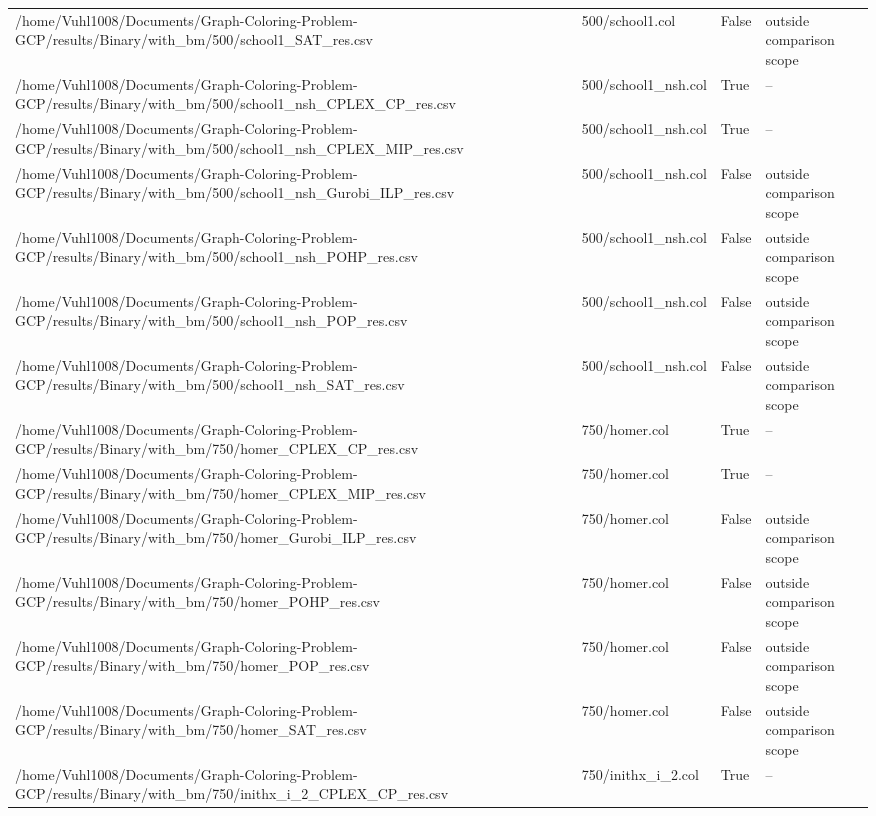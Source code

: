 \begin{table}[htbp]
\begin{tabular}{llll}
/home/Vuhl1008/Documents/Graph-Coloring-Problem-GCP/results/Binary/with\_bm/500/school1\_SAT\_res.csv & 500/school1.col & False & outside comparison scope \\
/home/Vuhl1008/Documents/Graph-Coloring-Problem-GCP/results/Binary/with\_bm/500/school1\_nsh\_CPLEX\_CP\_res.csv & 500/school1\_nsh.col & True & -- \\
/home/Vuhl1008/Documents/Graph-Coloring-Problem-GCP/results/Binary/with\_bm/500/school1\_nsh\_CPLEX\_MIP\_res.csv & 500/school1\_nsh.col & True & -- \\
/home/Vuhl1008/Documents/Graph-Coloring-Problem-GCP/results/Binary/with\_bm/500/school1\_nsh\_Gurobi\_ILP\_res.csv & 500/school1\_nsh.col & False & outside comparison scope \\
/home/Vuhl1008/Documents/Graph-Coloring-Problem-GCP/results/Binary/with\_bm/500/school1\_nsh\_POHP\_res.csv & 500/school1\_nsh.col & False & outside comparison scope \\
/home/Vuhl1008/Documents/Graph-Coloring-Problem-GCP/results/Binary/with\_bm/500/school1\_nsh\_POP\_res.csv & 500/school1\_nsh.col & False & outside comparison scope \\
/home/Vuhl1008/Documents/Graph-Coloring-Problem-GCP/results/Binary/with\_bm/500/school1\_nsh\_SAT\_res.csv & 500/school1\_nsh.col & False & outside comparison scope \\
/home/Vuhl1008/Documents/Graph-Coloring-Problem-GCP/results/Binary/with\_bm/750/homer\_CPLEX\_CP\_res.csv & 750/homer.col & True & -- \\
/home/Vuhl1008/Documents/Graph-Coloring-Problem-GCP/results/Binary/with\_bm/750/homer\_CPLEX\_MIP\_res.csv & 750/homer.col & True & -- \\
/home/Vuhl1008/Documents/Graph-Coloring-Problem-GCP/results/Binary/with\_bm/750/homer\_Gurobi\_ILP\_res.csv & 750/homer.col & False & outside comparison scope \\
/home/Vuhl1008/Documents/Graph-Coloring-Problem-GCP/results/Binary/with\_bm/750/homer\_POHP\_res.csv & 750/homer.col & False & outside comparison scope \\
/home/Vuhl1008/Documents/Graph-Coloring-Problem-GCP/results/Binary/with\_bm/750/homer\_POP\_res.csv & 750/homer.col & False & outside comparison scope \\
/home/Vuhl1008/Documents/Graph-Coloring-Problem-GCP/results/Binary/with\_bm/750/homer\_SAT\_res.csv & 750/homer.col & False & outside comparison scope \\
/home/Vuhl1008/Documents/Graph-Coloring-Problem-GCP/results/Binary/with\_bm/750/inithx\_i\_2\_CPLEX\_CP\_res.csv & 750/inithx\_i\_2.col & True & -- \\

\end{tabular}
\end{table}
